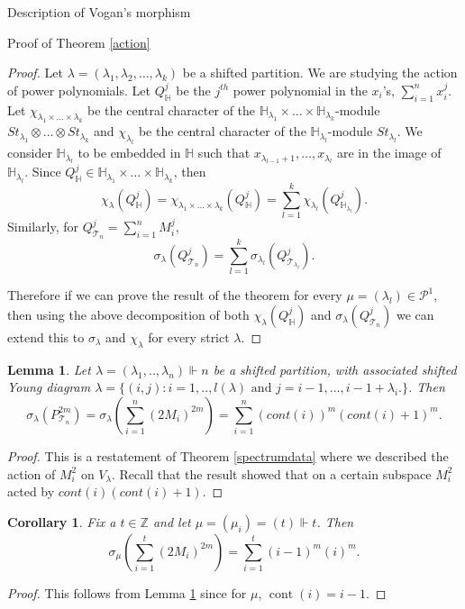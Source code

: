 \documentclass[a4paper,10pt]{amsart}
\newtheorem{corollary}[theorem]{Corollary}
\newtheorem{lemma}[theorem]{Lemma}
\DeclareMathOperator{\cont}{cont}
\begin{document}
\begin{section}{Description of Vogan's morphism}
\begin{subsection}{Proof of Theorem \ref{action}}
\begin{proof} Let $\lambda = (\lambda_1,\lambda_2,\ldots ,\lambda_k)$ be a shifted partition.
We are studying the action of power polynomials. Let $Q_{\mathbb{H}}^j$ be the $j^{th}$ power polynomial in the $x_i$'s, $\sum_{i=1}^n x_i^j$. Let $\chi_{\lambda_1 \times \ldots \times \lambda_k}$ be the central character of the $\mathbb{H}_{\lambda_1} \times \ldots \times \mathbb{H}_{\lambda_k}$-module $St_{\lambda_1} \otimes \ldots \otimes St_{\lambda_k}$ and $\chi_{\lambda_l}$ be the central character of the $\mathbb{H}_{\lambda_l}$-module $St_{\lambda_l}$. We consider $\mathbb{H}_{\lambda_l}$ to be embedded in $\mathbb{H}$ such that $x_{\lambda_{l-1}+1}, \ldots, x_{\lambda_l}$ are in the image of $\mathbb{H}_{\lambda_l}$. Since $Q_{\mathbb{H}}^j \in \mathbb{H}_{\lambda_1} \times \ldots \times \mathbb{H}_{\lambda_k}$, then
$$\chi_\lambda(Q_\mathbb{H}^j) = \chi_{\lambda_1 \times \ldots \times \lambda_k}(Q_\mathbb{H}^j) =  \sum_{l=1}^k \chi_{\lambda_l} (Q_{\mathbb{H}_{\lambda_l}}^j).$$
Similarly, for $Q_{\mathcal{T}_n}^j = \sum_{i=1}^n M_i^j$,
$$\sigma_\lambda (Q_{\mathcal{T}_n}^j) = \sum_{l=1}^k \sigma_{\lambda_l}(Q_{\mathcal{T}_{\lambda_l}}^j).$$

Therefore if we can prove the result of the theorem for every $\mu = (\lambda_l) \in \mathcal{P}^1$, then using the above decomposition of both $\chi_\lambda(Q_\mathbb{H}^j)$ and $\sigma_\lambda (Q_{\mathcal{T}_n}^j)$ we can extend this to $\sigma_{\lambda}$ and $\chi_\lambda$ for every strict $\lambda$. \end{proof}


\begin{lemma}\label{cont} Let $\lambda = (\lambda_1,..,\lambda_n) \Vdash n$ be a shifted partition, with associated shifted Young diagram $\lambda = \{(i,j) : i = 1,..,l(\lambda) \text{ and } j = i -1 ,\ldots ,i -1+ \lambda_i. \}$. Then 
$$\sigma_\lambda(P_{\mathcal{T}_n}^{2m}) =\sigma_\lambda(\sum_{i=1}^n (2M_i)^{2m}) = \sum_{i=1}^n (cont(i))^m(cont(i)+1)^m.$$
\end{lemma} 

\begin{proof} This is a restatement of Theorem \ref{spectrumdata} where we described the action of $M_i^2$ on $V_\lambda$. Recall that the result showed that on a certain subspace $M_i^2$ acted by $cont(i)(cont(i)+1)$.  \end{proof}
\begin{corollary}\label{actionT} Fix a $t\in \mathbb{Z}$ and let $\mu = (\mu_i) = (t) \Vdash t$. Then 
$$\sigma_\mu(\sum_{i=1}^t (2M_i)^{2m}) = \sum_{i=1}^t (i-1)^m(i)^m.$$ \end{corollary}
\begin{proof} This follows from Lemma \ref{cont} since for $\mu$, $\cont(i) = i-1$. \end{proof}



\end{subsection}
\end{section}
\end{document}
